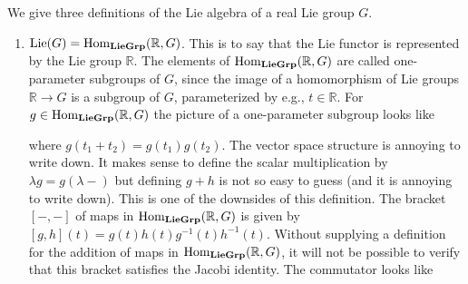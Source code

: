 \documentclass[../../rtnotes.tex]{subfiles}
\begin{document}
We give three definitions of the Lie algebra of a real Lie group $G$.
\begin{enumerate}
  \item $\operatorname{Lie}(G) = \operatorname{Hom}_{{\normalfont\mathbf{LieGrp}}}(\mathbb R, G)$. This is to say that the Lie functor is represented by the Lie group $\mathbb R$. The elements of $\operatorname{Hom}_{{\normalfont\mathbf{LieGrp}}}(\mathbb R, G)$ are called one-parameter subgroups of $G$, since the image of a homomorphism of Lie groups $\mathbb R \to G$ is a subgroup of $G$, parameterized by e.g., $t\in \mathbb R$. For $g\in \operatorname{Hom}_{{\normalfont\mathbf{LieGrp}}}(\mathbb R, G)$ the picture of a one-parameter subgroup looks like   
  \begin{figure}[h]
    \centering
{}
\end{figure}

where $g(t_1+t_2) = g(t_1)g(t_2)$. The vector space structure is annoying to write down. It makes sense to define the scalar multiplication by $\lambda g = g(\lambda -)$ but defining $g+h$ is not so easy to guess (and it is annoying to write down). This is one of the downsides of this definition. The bracket $[-,-]$ of maps in $\operatorname{Hom}_{{\normalfont\mathbf{LieGrp}}}(\mathbb R, G)$ is given by $[g,h](t) = g(t)h(t)g^{-1}(t)h^{-1}(t)$. Without supplying a definition for the addition of maps in $\operatorname{Hom}_{{\normalfont\mathbf{LieGrp}}}(\mathbb R, G)$, it will not be possible to verify that this bracket satisfies the Jacobi identity. The commutator looks like 
\begin{figure}[h]
  \centering
\end{figure}


\end{enumerate}
\end{document}
